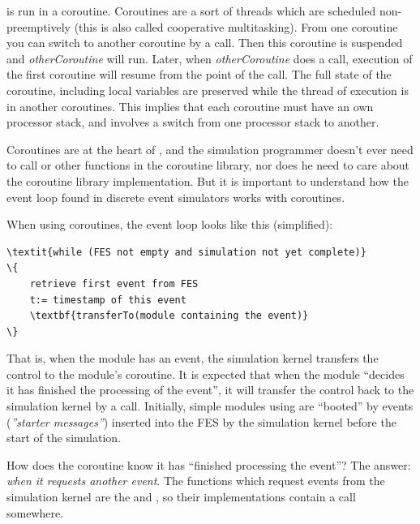  is run in a coroutine.
Coroutines are a sort of threads which are scheduled
non-preemptively (this is also called cooperative
multitasking). From one coroutine you
can switch to another coroutine by a
 call. Then this
coroutine is suspended and \textit{otherCoroutine} will run. Later,
when \textit{otherCoroutine} does a
 call, execution of
the first coroutine will resume from the point of the
 call.  The full state
of the coroutine, including local variables are preserved while the
thread of execution is in another coroutines.  This implies that each
coroutine must have an own processor stack, and
 involves a switch from one processor stack to
another.


Coroutines are at the heart of {\opp}, and the
simulation programmer doesn't ever need to call 
or other functions in the coroutine library, nor does he need to care
about the coroutine library implementation. But it is important to
understand how the event loop found in discrete event simulators works
with coroutines.


When using coroutines, the event loop looks like
this (simplified):


\begin{Verbatim}[commandchars=\\\{\}]
\textit{while (FES not empty and simulation not yet complete)}
\{
    retrieve first event from FES
    t:= timestamp of this event
    \textbf{transferTo(module containing the event)}
\}
\end{Verbatim}



That is, when the module has an event, the simulation
kernel transfers the control to the module's coroutine. It is expected
that when the module ``decides it has finished the processing of the
event'', it will transfer the control back to the simulation kernel by
a  call. Initially,
simple modules using  are
``booted'' by events (\textit{''starter messages''})
inserted into the FES by the simulation kernel before the
start of the simulation.


How does the coroutine know it has ``finished processing the event''?
The answer: \textit{when it requests another event}.  The functions
which request events from the simulation kernel are the
 and , so their
implementations contain a  call
somewhere.


